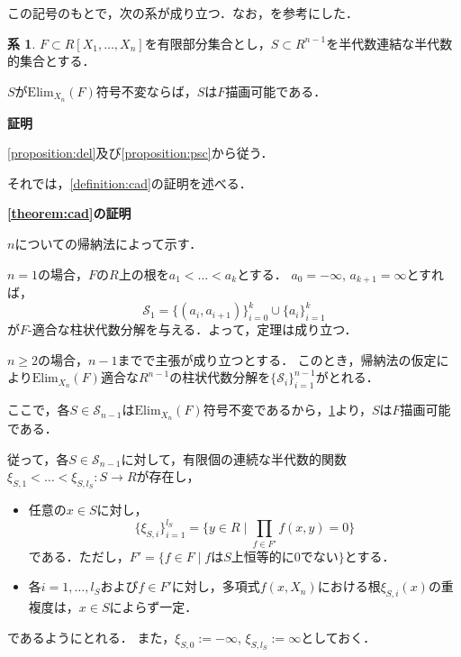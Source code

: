 \documentclass[uplatex, dvipdfmx]{jsarticle}
\makeatletter
\numberwithin{equation}{section}
\renewenvironment{proof}[1][\proofname]{\par
  \pushQED{\qed}%
  \normalfont \topsep6\p@\@plus6\p@\relax
  \trivlist
  \item\relax
  {\bfseries
  #1\@addpunct{.}}\hspace\labelsep\ignorespaces
}{
  \popQED\endtrivlist\@endpefalse
}
\newcommand{\calS}{\mathcal{S}}
\newcommand{\Elim}{\mathrm{Elim}}
\newcommand{\map}[3]{{#1}\colon{#2}\rightarrow{#3}}
\theoremstyle{definition}
\newtheorem{corollary}[definition]{系}
\renewcommand{\proofname}{\textbf{証明}}
\makeatother
\begin{document}
この記号のもとで，次の系が成り立つ．なお，\cite[Theorem 5.16.]{MR2248869}を参考にした．

\begin{corollary}\label{corollary:inv-deline}
$F \subset R[X_1, \dots, X_n]$を有限部分集合とし，$S \subset R^{n-1}$を半代数連結な半代数的集合とする．

$S$が$\Elim_{X_n}(F)$符号不変ならば，$S$は$F$描画可能である．
\end{corollary}

\begin{proof}
\cref{proposition:del}及び\cref{proposition:psc}から従う．
\end{proof}

それでは，\cref{definition:cad}の証明を述べる．

\begin{proof}[\cref{theorem:cad}の証明]
     $n$についての帰納法によって示す．

     $n=1$の場合，$F$の$R$上の根を$a_1 < \dots < a_k$とする．
     $a_0 = -\infty$, $a_{k+1} = \infty$とすれば，
     \begin{equation}
          \calS_1 = \{(a_i, a_{i+1})\}_{i=0}^k \cup \{a_i\}_{i=1}^k
     \end{equation}
     が$F$-適合な柱状代数分解を与える．よって，定理は成り立つ．

     $n\geq 2$の場合，$n-1$までで主張が成り立つとする．
     このとき，帰納法の仮定により$\Elim_{X_n}(F)$適合な$R^{n-1}$の柱状代数分解を$\{\calS_i\}_{i=1}^{n-1}$がとれる．

     ここで，各$S \in \calS_{n-1}$は$\Elim_{X_n}(F)$符号不変であるから，\cref{corollary:inv-deline}より，$S$は$F$描画可能である．

     従って，各$S \in \calS_{n-1}$に対して，有限個の連続な半代数的関数$\map{\xi_{S,1}< \dots < \xi_{S,l_S}}{S}{R}$が存在し，
     \begin{itemize}
          \item 任意の$ x \in S $に対し，
          \begin{equation}
               \{\xi_{S,i}\}_{i=1}^{l_S} = \{y \in R \mid \prod_{f \in F'}f(x,y)=0\}
          \end{equation}
          である．ただし，$F' = \{f \in F \mid \text{$f$は$S$上恒等的に0でない}\}$とする．
          \item 各$i=1, \dots, l_S$および$f \in F'$に対し，多項式$f(x,X_n)$における根$\xi_{S,i}(x)$の重複度は，$x\in S$によらず一定．
     \end{itemize}
     であるようにとれる．
     また，$\xi_{S,0} := -\infty$, $\xi_{S,l_S} := \infty$としておく．


\end{proof}
\end{document}
